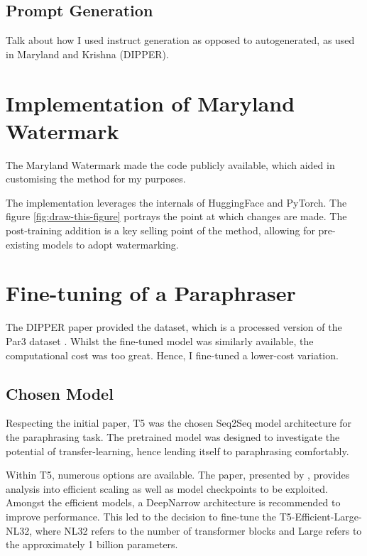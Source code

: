 \documentclass{l4proj}
\theoremstyle{definition}
\begin{document}
    \subsection{Prompt Generation}
        Talk about how I used instruct generation as opposed to autogenerated, as used in Maryland and Krishna (DIPPER).
    
\section{Implementation of Maryland Watermark}
    The Maryland Watermark \citep{kirchenbauer2023watermark} made the code publicly available, which aided in customising the method for my purposes.

    The implementation leverages the internals of HuggingFace and PyTorch. The figure \ref{fig:draw-this-figure} portrays the point at which changes are made. The post-training addition is a key selling point of the method, allowing for pre-existing models to adopt watermarking.


\section{Fine-tuning of a Paraphraser}
    The DIPPER paper \citep{krishna2023paraphrasing} provided the dataset, which is a processed version of the Par3 dataset \citep{Par3_2022}. Whilst the fine-tuned model was similarly available, the computational cost was too great. Hence, I fine-tuned a lower-cost variation.

    \subsection{Chosen Model}
        Respecting the initial paper, T5 was the chosen Seq2Seq model architecture for the paraphrasing task. The pretrained model was designed to investigate the potential of transfer-learning, hence lending itself to paraphrasing comfortably. 

        Within T5, numerous options are available. The paper, presented by \citet{tay2022scale}, provides analysis into efficient scaling as well as model checkpoints to be exploited. Amongst the efficient models, a DeepNarrow architecture is recommended to improve performance. This led to the decision to fine-tune the T5-Efficient-Large-NL32, where NL32 refers to the number of transformer blocks and Large refers to the approximately 1 billion parameters.
\end{document}
